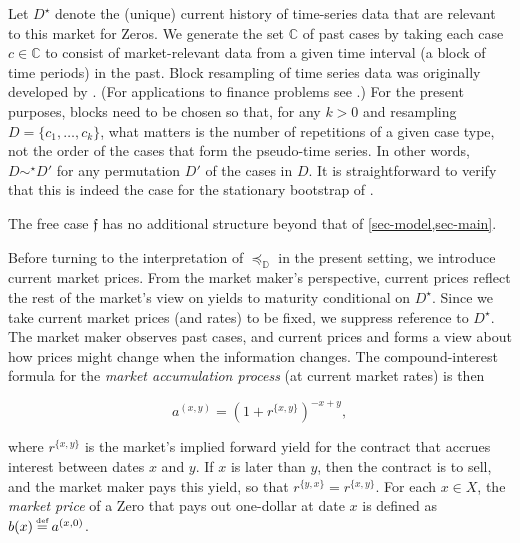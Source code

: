 \documentclass[12pt,a4paper,twoside]{article}
\newcommand{\novel}{\mathfrak f}
\newcommand{\mbbd}{{\mathds D}}
\newcommand{\mbbc}{{\mathds C}}
\newcommand{\past}{{D^\star}}
\newcommand{\xy}{{(x, y)}}
\begin{document}
Let $\past$ denote the (unique) current history of time-series data that are
relevant to this market for Zeros.  We generate the set $\mbbc$ of past cases
by taking each case $c \in \mbbc$ to consist of market-relevant data from a
given time interval (a block of time periods) in the past. Block resampling of
time series data was originally developed by
\citet{Kunsch-Block_bootstrap,PR-Stationary_bootstrap}. (For applications to
finance problems see \citet{White-Data_snooping,HL-Lucky_factors}.) For the
present purposes, blocks need to be chosen so that, for any $k > 0$ and
resampling $D = \{c_1, \dots, c_k\}$, what matters is the number of repetitions
of a given case type, not the order of the cases that form the pseudo-time
series. In other words, $D \sim^\star D'$ for any permutation $D'$ of the cases
in $D$.  It is straightforward to verify that this is indeed the case for the
stationary bootstrap of \citet[section 2]{PR-Stationary_bootstrap}.

The free case $\novel$ has no additional structure beyond that of
\cref{sec-model,sec-main}.

Before turning to the interpretation of $\preceq_\mbbd$ in the present setting,
we introduce current market prices. From the market maker's perspective,
current prices reflect the rest of the market's view on yields to maturity
conditional on $\past$. Since we take current market prices (and rates) to be
fixed, we suppress reference to $\past$. The market maker observes past cases,
and current prices and forms a view about how prices might change when the
information changes.  The compound-interest formula for the \emph{market
accumulation process} (at current market rates) is then
\begin{linenomath*}
  \begin{equation*}a^{\xy} = \left(1+r^{\{x,y\}}\right)^{-x + y},
  \end{equation*}
\end{linenomath*}
where $r^{\{x,y\}}$ is the market's implied forward yield for the contract that
accrues interest between dates $x$ and $y$. If $x$ is later than $y$, then the
contract is to sell, and the market maker pays this yield, so that $r^{\{y,x\}}
= r^{\{x,y\}}$. For each $x \in X$, the \emph{market price} of a Zero that pays
out one-dollar at date $x$ is defined as $b(x) \defeq a^{(x, 0)}$.
\end{document}
